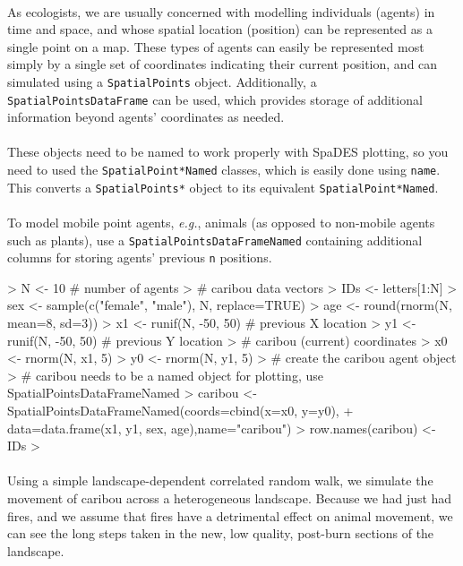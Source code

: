 \documentclass{article}
\begin{document}
\paragraph{}
As ecologists, we are usually concerned with modelling individuals (agents) in time and space, and whose spatial location (position) can be represented as a single point on a map. These types of agents can easily be represented most simply by a single set of coordinates indicating their current position, and can simulated using a \texttt{SpatialPoints} object. Additionally, a \texttt{SpatialPointsDataFrame} can be used, which provides storage of additional information beyond agents' coordinates as needed.

\paragraph{}
These objects need to be named to work properly with SpaDES plotting, so you need to used the \texttt{SpatialPoint*Named} classes, which is easily done using \texttt{name}. This converts a \texttt{SpatialPoints*} object to its equivalent \texttt{SpatialPoint*Named}.

\paragraph{}
To model mobile point agents, \textit{e.g.}, animals (as opposed to non-mobile agents such as plants), use a \texttt{SpatialPointsDataFrameNamed} containing additional columns for storing agents' previous \texttt{n} positions.

\begin{Schunk}
\begin{Sinput}
> N <- 10 # number of agents
> # caribou data vectors
> IDs <- letters[1:N]
> sex <- sample(c("female", "male"), N, replace=TRUE)
> age <- round(rnorm(N, mean=8, sd=3))
> x1 <- runif(N, -50, 50) # previous X location
> y1 <- runif(N, -50, 50) # previous Y location
> # caribou (current) coordinates
> x0 <- rnorm(N, x1, 5)
> y0 <- rnorm(N, y1, 5)
> # create the caribou agent object
> # caribou needs to be a named object for plotting, use SpatialPointsDataFrameNamed
> caribou <- SpatialPointsDataFrameNamed(coords=cbind(x=x0, y=y0),
+                                   data=data.frame(x1, y1, sex, age),name="caribou")
> row.names(caribou) <- IDs
> 
\end{Sinput}
\end{Schunk}

\paragraph{}
Using a simple landscape-dependent correlated random walk, we simulate the movement of caribou across a heterogeneous landscape. Because we had just had fires, and we assume that fires have a detrimental effect on animal movement, we can see the long steps taken in the new, low quality, post-burn sections of the landscape.
\end{document}
